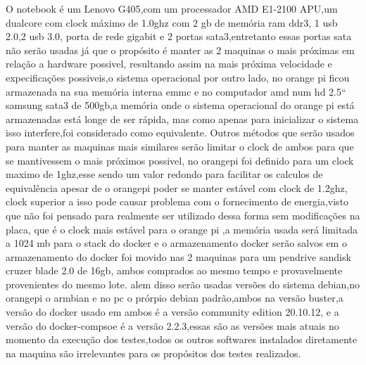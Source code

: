 \documentclass[
	12pt,				%
	openright,			%
	oneside,			%
	a4paper,			%
	english,			%
	french,				%
	spanish,			%
	brazil,				%
	]{abntex2}
\begin{document}
O notebook é um Lenovo G405\cite{G405},com um processador AMD E1-2100 \cite{E1} APU,um dualcore com clock máximo de 1.0ghz com 2 gb de memória ram ddr3, 1 usb 2.0,2 usb 3.0, 
porta de rede gigabit e 2 portas sata3,entretanto essas portas sata não serão usadas já que o propósito é manter as 2 maquinas o mais próximas em relação a hardware possivel,
resultando assim na mais próxima velocidade e expecificações possiveis,o sistema operacional por outro lado,
no orange pi ficou armazenada na sua memória interna emmc e no computador amd num hd 2.5`` samsung sata3 de 500gb,a memória onde o sistema operacional do orange pi está armazenadas está longe de ser rápida,
mas como apenas para inicializar o sistema isso interfere,foi considerado como equivalente.\newline
Outros métodos que serão usados para manter as maquinas mais similares serão limitar o clock de ambos para que se mantivessem o mais próximos possivel,
no orangepi foi definido para um clock maximo de 1ghz,esse sendo um valor redondo para facilitar os calculos de equivalência apesar de o orangepi poder se manter estável com clock de 1.2ghz,
clock superior a isso pode causar problema com o fornecimento de energia,visto que não foi pensado para realmente ser utilizado dessa forma sem modificações na placa,
que é o clock mais estável para o orange pi ,a memória usada será limitada a 1024 mb para o stack do docker e o armazenamento docker serão salvos em o armazenamento do docker foi movido nas 2 maquinas para um pendrive sandisk cruzer blade 2.0 de 16gb,
ambos comprados ao mesmo tempo e provavelmente provenientes do mesmo lote.\newline
alem disso serão usadas versões do sistema debian,no orangepi o armbian e no pc o prórpio debian padrão,ambos na versão buster,a versão do docker usado em ambos é a versão community edition 20.10.12,
e a versão do docker-compsoe é a versão 2.2.3,essas são as versões mais atuais no momento da execução dos testes,todos os outros softwares instalados diretamente na maquina são irrelevantes para os propósitos dos testes realizados.
\end{document}
